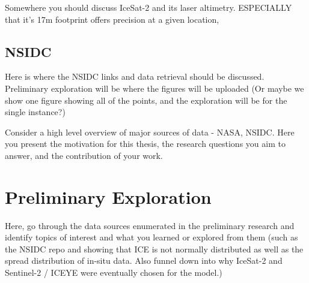 Somewhere you should discuss IceSat-2 and its laser altimetry. ESPECIALLY that it's 17m footprint offers precision at a given location, 
\subsection*{NSIDC}
Here is where the NSIDC links and data retrieval should be discussed. Preliminary exploration will be where the figures will be uploaded (Or maybe we show one figure showing all of the points, and the exploration will be for the single instance?)

Consider a high level overview of major sources of data - NASA, NSIDC. 
Here you present the motivation for this thesis, the research questions you aim to answer, and the contribution of your work.
\section {Preliminary Exploration}
Here, go through the data sources enumerated in the preliminary research and identify topics of interest and what you learned or explored from them (such as the NSIDC repo and showing that ICE is not normally distributed as well as the spread distribution of in-situ data. Also funnel down into why IceSat-2 and Sentinel-2 / ICEYE were eventually chosen for the model.)